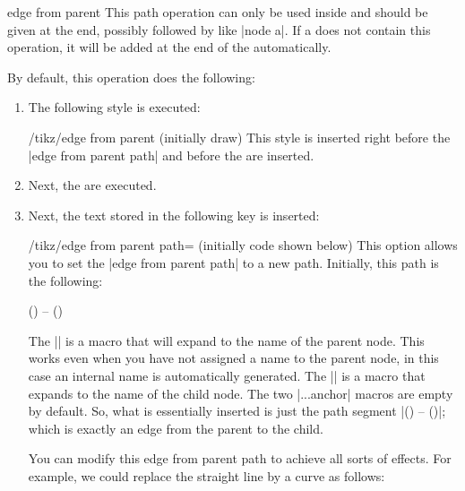 \begin{pathoperation}{edge from parent}{}
  This path operation can only be used inside  and
  should be given at the end, possibly followed by  like |node {a}|. If a  does not
  contain this operation, it will be added at the end of the
   automatically.

  By default, this operation does the following:
  \begin{enumerate}
  \item The following style is executed:
    \begin{stylekey}{/tikz/edge from parent (initially draw)}
      This style is inserted right before the |edge from parent path| and
      before the  are inserted.
\begin{codeexample}[]
\end{codeexample}
    \end{stylekey}
  \item Next, the  are executed.
  \item Next, the text stored in the following key is inserted:
  \begin{key}{/tikz/edge from parent path= (initially
      \normalfont code shown below)}
    This option allows you to set the |edge from parent path| to a new
    path. Initially, this path is the following:
\begin{codeexample}
(\tikzparentnode\tikzparentanchor) -- (\tikzchildnode\tikzchildanchor)
\end{codeexample}
    The |\tikzparentnode| is a macro that will expand to the name of
    the parent node. This works even when you have not assigned a name
    to the parent node, in this case an internal name is automatically
    generated. The |\tikzchildnode| is a macro that expands to the
    name of the child node. The two |...anchor| macros are empty by
    default. So, what is essentially inserted is just the path segment
    |(\tikzparentnode) -- (\tikzchildnode)|; which is exactly an edge
    from the parent to the child.

    You can modify this edge from parent path to achieve all sorts of
    effects. For example, we could replace the straight line by a
    curve as follows:
\begin{codeexample}[]
\end{codeexample}


\end{key}
\end{enumerate}
\end{pathoperation}
